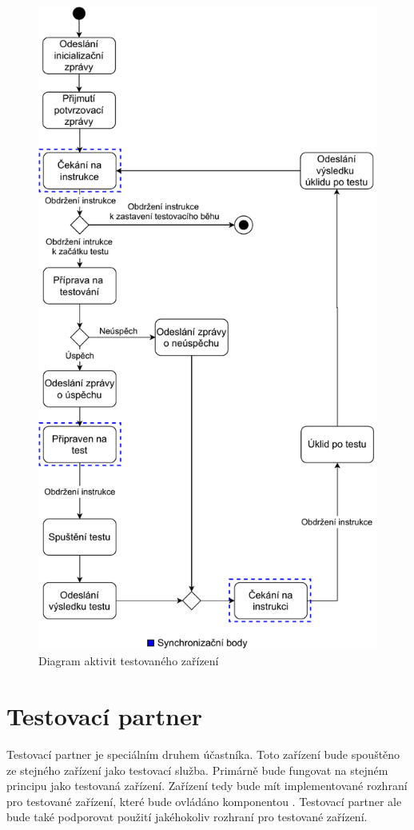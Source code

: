 \begin{figure}
    \centering 
    \includegraphics[height=0.98\textheight]{assets/img/activitydiagramdevice.pdf}
    \caption{Diagram aktivit testovaného zařízení}
    \label{fig:act_diag_device}
\end{figure}


\section{Testovací partner}
Testovací partner je speciálním druhem účastníka. Toto zařízení bude spouštěno ze stejného zařízení jako testovací služba. Primárně bude fungovat na stejném principu jako testovaná zařízení. Zařízení tedy bude mít implementované rozhraní pro testované zařízení, které bude ovládáno komponentou . Testovací partner ale bude také podporovat použití jakéhokoliv rozhraní pro testované zařízení. 

